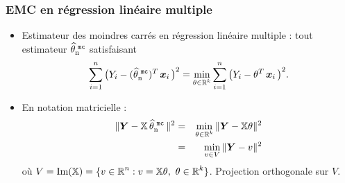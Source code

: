 





\begin{frame}
\frametitle{EMC en régression linéaire multiple}
\begin{itemize}
\item Estimateur des \alert{moindres carrés} en régression
linéaire multiple : tout estimateur $\operatorname{\widehat \theta_n^{\,\,{\tt mc}}}$ satisfaisant
$$\sum_{i = 1}^n
\big(Y_i-(\operatorname{\widehat \theta_n^{\,\,{\tt mc}}})^T\operatorname{\boldsymbol{x}}_i\big)^2 = \min_{\theta \in \operatorname{{\mathbb R}}^k}\sum_{i =
1}^n \big(Y_i-{\theta}^T\operatorname{\boldsymbol{x}}_i\big)^2.$$
\item En notation matricielle :
\begin{eqnarray*} \|\boldsymbol{Y}-\mathbb{X}\operatorname{\widehat \theta_n^{\,\,{\tt mc}}}\|^2 &=& \min_{\theta \in
\operatorname{{\mathbb R}}^k}\|\boldsymbol{Y}-\mathbb{X}\theta\|^2\\
&=& \min_{v \in V}\|\boldsymbol{Y}-v\|^2
\end{eqnarray*}
o\`u $V=\text{Im}(\mathbb{X}) = \{v\in \operatorname{{\mathbb R}}^n: v=\mathbb{X}\theta, \
\theta\in \operatorname{{\mathbb R}}^k\}$.
 Projection orthogonale sur $V$.
 \end{itemize}
 \end{frame}


